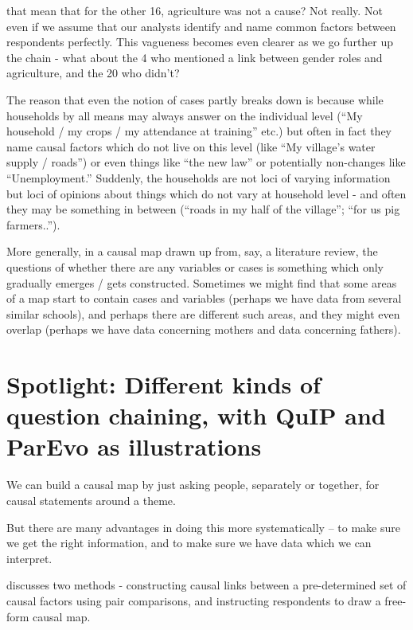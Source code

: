 \documentclass[
]{book}
\begin{document}
that mean that for the other 16, agriculture was not a cause? Not really. Not even if we assume that our analysts identify and name common factors between respondents perfectly. This vagueness becomes even clearer as we go further up the chain - what about the 4 who mentioned a link between gender roles and agriculture, and the 20 who didn't?

The reason that even the notion of cases partly breaks down is because while households by all means may always answer on the individual level (``My household / my crops / my attendance at training'' etc.) but often in fact they name causal factors which do not live on this level (like ``My village's water supply / roads'') or even things like ``the new law'' or potentially non-changes like ``Unemployment.'' Suddenly, the households are not loci of varying information but loci of opinions about things which do not vary at household level - and often they may be something in between (``roads in my half of the village''; ``for us pig farmers..'').
 

More generally, in a causal map drawn up from, say, a literature review, the questions of whether there are any variables or cases is something which only gradually emerges / gets constructed. Sometimes we might find that some areas of a map start to contain cases and variables (perhaps we have data from several similar schools), and perhaps there are different such areas, and they might even overlap (perhaps we have data concerning mothers and data concerning fathers).

\hypertarget{spotlight-different-kinds-of-question-chaining-with-quip-and-parevo-as-illustrations}{%
\chapter{Spotlight: Different kinds of question chaining, with QuIP and ParEvo as illustrations}\label{spotlight-different-kinds-of-question-chaining-with-quip-and-parevo-as-illustrations}}

We can build a causal map by just asking people, separately or together, for causal statements around a theme.

But there are many advantages in doing this more systematically -- to make sure we get the right information, and to make sure we have data which we can interpret.

discusses two methods - constructing causal links between a pre-determined set of causal factors using pair comparisons, and instructing respondents to draw a free-form causal map.
\end{document}
